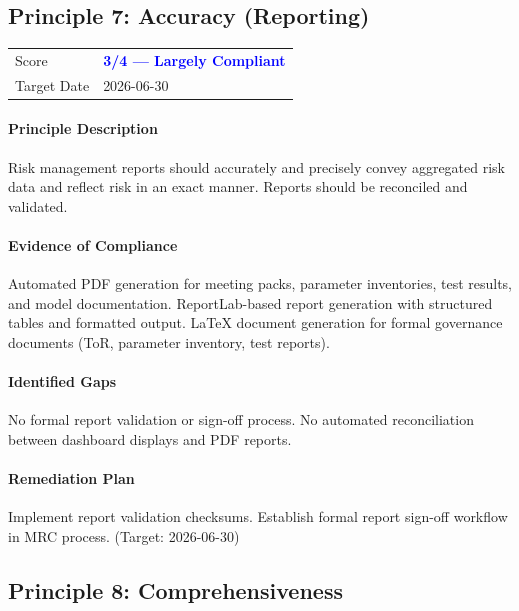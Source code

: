 \documentclass[11pt]{article}
\begin{document}
\subsection{Principle 7: Accuracy (Reporting)}

\begin{table}[H]
    \centering
    \begin{tabular}{ll}
        \toprule
        Score & \textcolor{blue}{\textbf{3/4 --- Largely Compliant}} \\
        Target Date & 2026-06-30 \\
        \bottomrule
    \end{tabular}
\end{table}

\paragraph{Principle Description}
Risk management reports should accurately and precisely convey aggregated risk data and reflect risk in an exact manner. Reports should be reconciled and validated.

\paragraph{Evidence of Compliance}
Automated PDF generation for meeting packs, parameter inventories, test results, and model documentation. ReportLab-based report generation with structured tables and formatted output. LaTeX document generation for formal governance documents (ToR, parameter inventory, test reports).

\paragraph{Identified Gaps}
No formal report validation or sign-off process. No automated reconciliation between dashboard displays and PDF reports.

\paragraph{Remediation Plan}
Implement report validation checksums. Establish formal report sign-off workflow in MRC process. (Target: 2026-06-30)

\subsection{Principle 8: Comprehensiveness}
\end{document}
